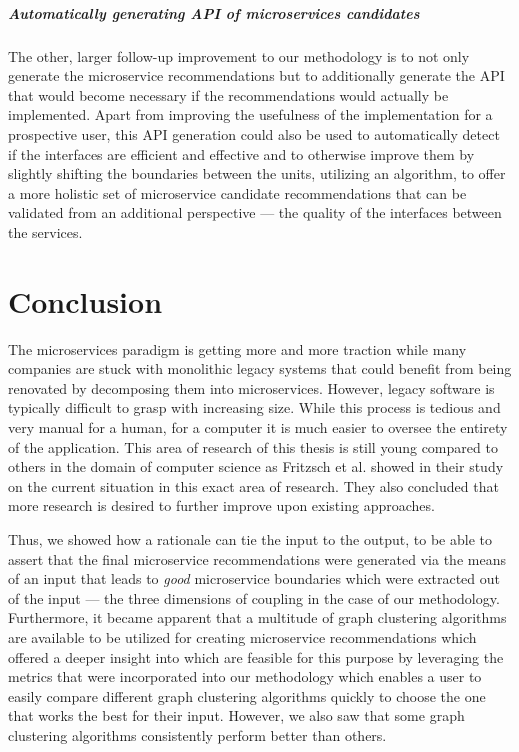 \documentclass[12pt,a4paper]{report}
\begin{document}
\paragraph{Automatically generating API of microservices candidates}
The other, larger follow-up improvement to our methodology is to not only
generate the microservice recommendations but to additionally generate the
API that would become necessary if the recommendations would actually be
implemented. Apart from improving the usefulness of the implementation
for a prospective user, this API generation could also be used to
automatically detect if the interfaces are efficient and effective and
to otherwise improve them by slightly shifting the boundaries between
the units, utilizing an algorithm, to offer a more holistic set of
microservice candidate recommendations that can be validated from an
additional perspective --- the quality of the interfaces between the services.




\chapter{Conclusion} \label{chap:conclusion}

The microservices paradigm is getting more and more traction while
many companies are stuck with monolithic legacy systems that could
benefit from being renovated by decomposing them into microservices.
However, legacy software is typically difficult to grasp with increasing size.
While this process is tedious and very manual for a human,
for a computer it is much easier to oversee the entirety of the
application. This area of research of this thesis is still young compared
to others in the domain of computer science as Fritzsch et al. showed in their
study on the current situation in this exact area of research.
They also concluded that more research is desired to further improve
upon existing approaches.

Thus, we showed how a rationale can tie the input to the output,
to be able to assert that the final microservice recommendations
were generated via the means of an input that leads to \textit{good}
microservice boundaries which were extracted out of the input ---
the three dimensions of coupling in the case of our methodology.
Furthermore, it became apparent that a multitude of graph clustering
algorithms are available to be utilized for creating microservice
recommendations which offered a deeper insight into which are
feasible for this purpose by leveraging the metrics that were
incorporated into our methodology which enables a user to easily
compare different graph clustering algorithms quickly to choose the
one that works the best for their input. However, we also saw that
some graph clustering algorithms consistently perform better than others.
\end{document}
